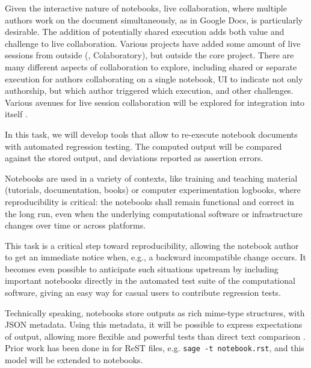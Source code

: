 \begin{workpackage}
\begin{tasklist}
\begin{task}[id=notebook-collab,title=Notebook improvements for collaboration,lead=SR]
  Given the interactive nature of \Jupyter notebooks, live collaboration, where multiple authors
  work on the document simultaneously, as in Google Docs, is particularly desirable. The addition
  of potentially shared execution adds both value and challenge to live collaboration. Various
  projects have added some amount of live sessions from outside (\SMC, Colaboratory), but
  outside the core project. There are many different aspects of collaboration to explore,
  including shared or separate execution for authors collaborating on a single notebook,
  UI to indicate not only authorship,
  but which author triggered which execution, and other challenges.
  Various avenues for live session collaboration will be explored for integration into \Jupyter itself
  .
\end{task}




\begin{task}[id=notebook-verification,title=Reproducible Notebooks,lead=SR]
  In this task, we will develop tools that allow to re-execute
  notebook documents with automated regression testing. The computed
  output will be compared against the stored output, and deviations
  reported as assertion errors.

  Notebooks are used in a variety of contexts, like training and
  teaching material (tutorials, documentation, books) or computer
  experimentation logbooks, where reproducibility is critical: the
  notebooks shall remain functional and correct in the long run, even
  when the underlying computational software or infrastructure changes
  over time or across platforms.

  This task is a critical step toward reproducibility, allowing the
  notebook author to get an immediate notice when, e.g., a backward
  incompatible change occurs. It becomes even possible to anticipate
  such situations upstream by including important notebooks directly
  in the automated test suite of the computational software, giving an
  easy way for casual users to contribute regression tests.

  Technically speaking, \Jupyter notebooks store outputs as rich mime-type structures,
  with JSON metadata. Using this metadata, it will be possible to express
  expectations of output, allowing more flexible and powerful tests
  than direct text comparison .
  Prior work has been done in \Sage for ReST files, e.g. \lstinline{sage -t notebook.rst},
  and this model will be extended to notebooks.
\end{task}


\end{tasklist}
\end{workpackage}
